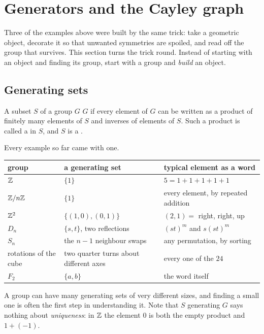 \section{Generators and the Cayley graph}\label{sec:cayley}

Three of the examples above were built by the same trick: take a geometric object, decorate it so
that unwanted symmetries are spoiled, and read off the group that survives. This section turns the
trick round. Instead of starting with an object and finding its group, start with a group and
\emph{build} an object.

\subsection{Generating sets}

\begin{defi}\label{def:gen}
A subset $S$ of a group $G$  $G$ if every element of $G$ can be written as a product
of finitely many elements of $S$ and inverses of elements of $S$. Such a product is called a
 in $S$, and $S$ is a .
\end{defi}

Every example so far came with one.

\begin{center}
\small
\begin{tabular}{@{}lll@{}}
\toprule
group & a generating set & typical element as a word\\
\midrule
$\mathbb{Z}$ & $\{1\}$ & $5=1+1+1+1+1$\\
$\mathbb{Z}/n\mathbb{Z}$ & $\{1\}$ & every element, by repeated addition\\
$\mathbb{Z}^2$ & $\{(1,0),(0,1)\}$ & $(2,1)=$ right, right, up\\
$D_n$ & $\{s,t\}$, two reflections & $(st)^m$ and $s(st)^m$\\
$S_n$ & the $n-1$ neighbour swaps & any permutation, by sorting\\
rotations of the cube & two quarter turns about different axes & every one of the $24$\\
$F_2$ & $\{a,b\}$ & the word itself\\
\bottomrule
\end{tabular}
\end{center}

A group can have many generating sets of very different sizes, and finding a small one is often the
first step in understanding it. Note that $S$ generating $G$ says nothing about \emph{uniqueness}:
in $\mathbb{Z}$ the element $0$ is both the empty product and $1+(-1)$.

